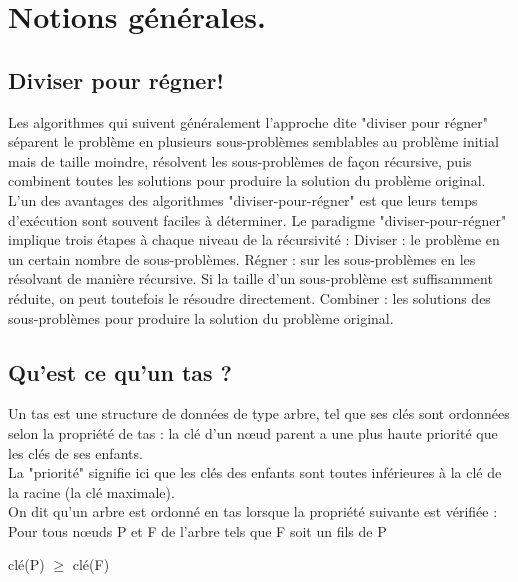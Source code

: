 \documentclass[12pt]{article}
\begin{document}
\def\reportnumber{1}
\def\reporttitle{Étude expérimentale des Algorithmes de Tri.}



\tableofcontents
\setcounter{tocdepth}{2}

\newpage

\section{Notions générales.}
\subsection{Diviser pour régner!}
Les algorithmes qui suivent généralement l'approche dite "diviser pour régner" séparent le problème en plusieurs sous-problèmes semblables au problème initial mais de taille moindre, résolvent les sous-problèmes de façon récursive, puis combinent toutes les solutions pour produire la solution du problème original.
L'un des avantages des algorithmes "diviser-pour-régner" est que leurs temps d'exécution sont souvent faciles à déterminer.
Le paradigme "diviser-pour-régner" implique trois étapes à chaque niveau de la récursivité :
    Diviser : le problème en un certain nombre de sous-problèmes.
    Régner : sur les sous-problèmes en les résolvant de manière récursive. Si la taille d'un sous-problème est suffisamment réduite, on peut toutefois le résoudre directement.
    Combiner : les solutions des sous-problèmes pour produire la solution du problème original.
    
\subsection{Qu'est ce qu'un tas ?}
Un tas est une structure de données de type arbre, tel que ses clés sont ordonnées selon la propriété de tas : la clé d'un nœud parent a une plus haute priorité que les clés de ses enfants.\\
 La "priorité" signifie ici que les clés des enfants sont toutes inférieures à la clé de la racine (la clé maximale).\\
 
 On dit qu'un arbre est ordonné en tas lorsque la propriété suivante est vérifiée :\\

Pour tous nœuds P et F de l'arbre tels que F soit un fils de P
\begin{center}
clé(P) $\ge$ clé(F)\\
\end{center}
\end{document}
